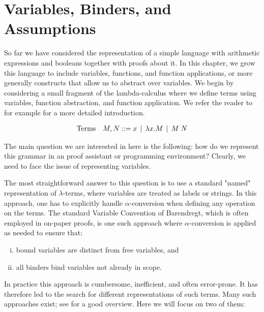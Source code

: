 \chapter{Variables, Binders, and Assumptions}
\label{chap:binders}
So far we have considered the representation of a simple language with
arithmetic expressions and booleans together with proofs about it. In this
chapter, we grow this language to include variables, functions, and function applications,
or more generally constructs that allow us to abstract over
variables. We begin by considering a small fragment of the
lambda-calculus where we define terms using variables, function
abstraction, and function application. We refer the reader to for
example \citep[Ch 5, Ch 9]{TAPL} for a more detailed introduction.

\[
\begin{array}{ll@{\bnfas}l}
\mbox{Terms} & M, N & x \bnfalt \lam x.M \bnfalt M \app N
\end{array}
\]

The main question we are interested in here is the following: how do we
represent this grammar in an proof assistant or programming environment? Clearly, we need to
face the issue of representing variables.

The most straightforward answer to this question is to use a standard "named" representation of
$\lambda$-terms, where variables are treated as labels or strings. In
this approach, one has to explicitly handle $\alpha$-conversion when
defining any operation on the terms. The standard Variable Convention
of Barendregt, which is often employed in on-paper proofs, is one such
approach where $\alpha$-conversion is applied as needed to ensure
that:

\begin{enumerate}[(i)]
\item bound variables are distinct from free variables, and
\item all binders bind variables not already in scope.
\end{enumerate}

In practice this approach is cumbersome, inefficient, and often error-prone. It
has therefore led to the search for different representations of such
terms. Many such approaches exist; see \cite{Aydemir:TechReport09} for
a good overview. Here we will focus on two of them:

